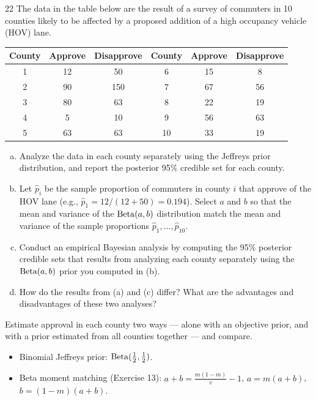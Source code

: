 \documentclass[11pt]{article}
\begin{document}
\begin{problem}{22}
The data in the table below are the result of a survey of commuters in 10 counties likely to be affected by a proposed addition of a high occupancy vehicle (HOV) lane.
\begin{center}
\small
\begin{tabular}{ccc|ccc}\toprule
County & Approve & Disapprove & County & Approve & Disapprove\\\midrule
1 & 12 & 50 & 6 & 15 & 8\\
2 & 90 & 150 & 7 & 67 & 56\\
3 & 80 & 63 & 8 & 22 & 19\\
4 & 5 & 10 & 9 & 56 & 63\\
5 & 63 & 63 & 10 & 33 & 19\\\bottomrule
\end{tabular}
\end{center}
\begin{enumerate}[(a)]
\item Analyze the data in each county separately using the Jeffreys prior distribution, and report the posterior 95\% credible set for each county.
\item Let $\hat p_i$ be the sample proportion of commuters in county $i$ that approve of the HOV lane (e.g., $\hat p_1=12/(12+50)=0.194$). Select $a$ and $b$ so that the mean and variance of the $\mathrm{Beta}(a,b)$ distribution match the mean and variance of the sample proportions $\hat p_1,\dots,\hat p_{10}$.
\item Conduct an empirical Bayesian analysis by computing the 95\% posterior credible sets that results from analyzing each county separately using the $\mathrm{Beta}(a,b)$ prior you computed in (b).
\item How do the results from (a) and (c) differ? What are the advantages and disadvantages of these two analyses?
\end{enumerate}
\end{problem}

\begin{restate}
Estimate approval in each county two ways --- alone with an objective prior, and with a prior estimated from all counties together --- and compare.
\end{restate}

\begin{recall}
\begin{itemize}
\item Binomial Jeffreys prior: $\mathrm{Beta}(\frac12,\frac12)$.
\item Beta moment matching (Exercise 13): $a+b=\frac{m(1-m)}{v}-1$, $a=m(a+b)$, $b=(1-m)(a+b)$.
\end{itemize}
\end{recall}
\end{document}
